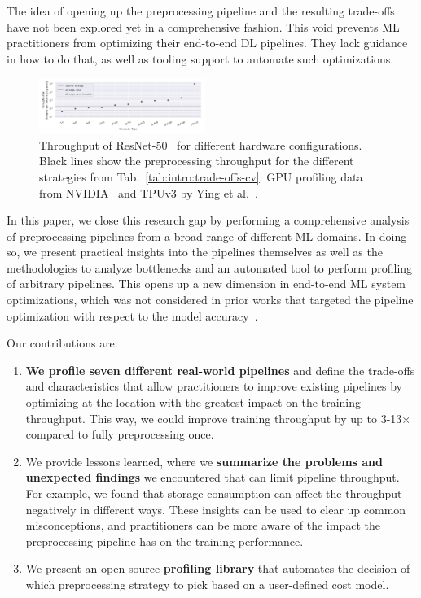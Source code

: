 The idea of opening up the preprocessing pipeline and the resulting trade-offs have not been explored yet in a comprehensive fashion.
This void prevents ML practitioners from optimizing their end-to-end DL pipelines.
They lack guidance in how to do that, as well as tooling support to automate such optimizations.

\vspace{-0.5cm}
\begin{figure}[h]
    \centering
    \includegraphics[width=0.48\textwidth]{figures/misc/gpu-comparison-resnet.png}
    \vspace{-0.8cm}
    \caption{Throughput of ResNet-50~\cite{he2016deep} for different hardware configurations. Black lines show the preprocessing throughput for the different strategies from Tab.~\ref{tab:intro:trade-offs-cv}. GPU profiling data from NVIDIA~\cite{nvidiabenchmarks2020} and TPUv3 by Ying et al.~\cite{ying2018image}.}
    \label{fig:gpu-resnet-throughput}
\end{figure}
\vspace{-0.4cm}

In this paper, we close this research gap by performing a comprehensive analysis of preprocessing pipelines from a broad range of different ML domains.
In doing so, we present practical insights into the pipelines themselves as well as the methodologies to analyze bottlenecks and an automated tool to perform profiling of arbitrary pipelines.
This opens up a new dimension in end-to-end ML system optimizations, which was not considered in prior works that targeted the pipeline optimization with respect to the model accuracy~\cite{mohan2020analyzing, kang2020jointly}.

Our contributions are:
\begin{enumerate}
    \item \textbf{We profile seven different real-world pipelines} and define the trade-offs and characteristics that allow practitioners to improve existing pipelines by optimizing at the location with the greatest impact on the training throughput. This way, we could improve training throughput by up to {\color{diff}3-13$\times$ compared to fully preprocessing once.}
    \item We provide lessons learned, where we \textbf{summarize the problems and unexpected findings} we encountered that can limit pipeline throughput. For example, we found that storage consumption {\color{diff}can affect the throughput negatively in different ways.} These insights can be used to clear up common misconceptions, and practitioners can be more aware of the impact the preprocessing pipeline has on the training performance.
    \item We present an open-source \textbf{profiling library} that automates the decision of which preprocessing strategy to pick based on a user-defined cost model.
\end{enumerate}

